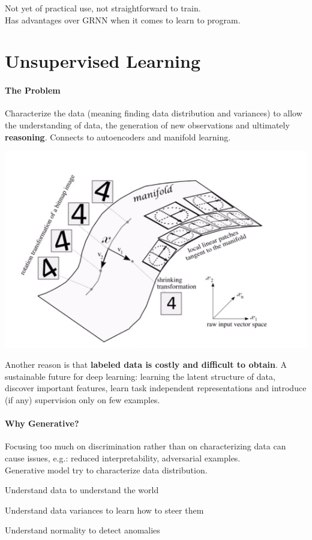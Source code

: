 \documentclass[10pt]{report}
\begin{document}
Not yet of practical use, not straightforward to train.\\
Has advantages over GRNN when it comes to learn to program.
\section{Unsupervised Learning}
\paragraph{The Problem} Characterize the data (meaning finding data distribution and variances) to allow the understanding of data, the generation of new observations and ultimately \textbf{reasoning}. Connects to autoencoders and manifold learning.\begin{center}
	\includegraphics[scale=0.5]{138.png}
\end{center}
Another reason is that \textbf{labeled data is costly and difficult to obtain}. A sustainable future for deep learning: learning the latent structure of data, discover important features, learn task independent representations and introduce (if any) supervision only on few examples.
\paragraph{Why Generative?} Focusing too much on discrimination rather than on characterizing data can cause issues, e.g.: reduced interpretability, adversarial examples.\\
Generative model try to characterize data distribution. \begin{list}{}{}
	\item Understand data to understand the world
	\item Understand data variances to learn how to steer them
	\item Understand normality to detect anomalies
\end{list}
\end{document}
